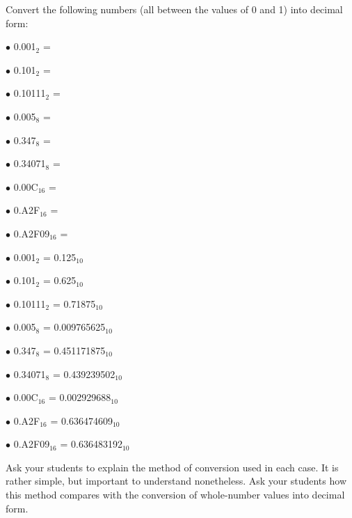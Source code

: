 

Convert the following numbers (all between the values of 0 and 1) into decimal form:

\medskip
\item{$\bullet$} 0.001$_2$ = 
\item{$\bullet$} 0.101$_2$ = 
\item{$\bullet$} 0.10111$_2$ = 
\item{$\bullet$} 0.005$_8$ = 
\item{$\bullet$} 0.347$_8$ = 
\item{$\bullet$} 0.34071$_8$ = 
\item{$\bullet$} 0.00C$_{16}$ = 
\item{$\bullet$} 0.A2F$_{16}$ =
\item{$\bullet$} 0.A2F09$_{16}$ =
\medskip







\medskip
\item{$\bullet$} 0.001$_2$ = 0.125$_{10}$
\item{$\bullet$} 0.101$_2$ = 0.625$_{10}$
\item{$\bullet$} 0.10111$_2$ = 0.71875$_{10}$
\item{$\bullet$} 0.005$_8$ = 0.009765625$_{10}$
\item{$\bullet$} 0.347$_8$ = 0.451171875$_{10}$
\item{$\bullet$} 0.34071$_8$ = 0.439239502$_{10}$
\item{$\bullet$} 0.00C$_{16}$ = 0.002929688$_{10}$
\item{$\bullet$} 0.A2F$_{16}$ = 0.636474609$_{10}$
\item{$\bullet$} 0.A2F09$_{16}$ = 0.636483192$_{10}$
\medskip







Ask your students to explain the method of conversion used in each case.  It is rather simple, but important to understand nonetheless.  Ask your students how this method compares with the conversion of whole-number values into decimal form.





